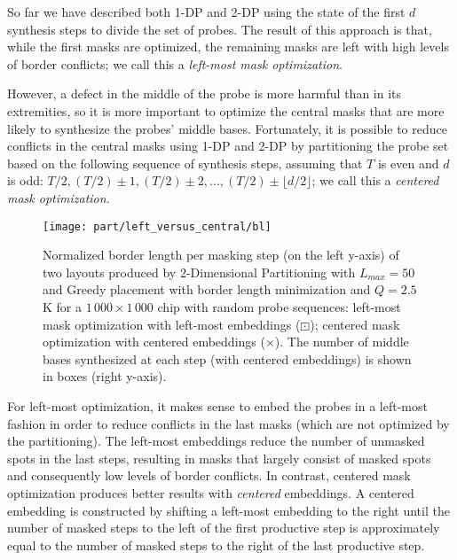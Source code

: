 So far we have described both 1-DP and 2-DP using the state of the first $d$
synthesis steps to divide the set of probes. The result of this approach is
that, while the first masks are optimized, the remaining masks are left with
high levels of border conflicts; we call this a \emph{left-most mask
optimization}.

However, a defect in the middle of the probe is more harmful than in its
extremities, so it is more important to optimize the central masks that are more
likely to synthesize the probes' middle bases. Fortunately, it is possible to
reduce conflicts in the central masks using 1-DP and 2-DP by partitioning the
probe set based on the following sequence of synthesis steps, assuming that $T$
is even and $d$ is odd:
$T/2, (T/2)\pm 1, (T/2)\pm 2, \dots, (T/2)\pm\lfloor d/2\rfloor$; we call this a
\emph{centered mask optimization}.

\begin{figure}[t]\centering
\texttt{[image: part/left\_versus\_central/bl]}
\caption{\label{fig:2d_left_center}
  Normalized border length per masking step (on the left y-axis) of two layouts
  produced by 2-Dimensional Partitioning with $L_{max}=50$ and Greedy placement
  with border length minimization and $Q=2.5$K for a $1\,000 \times 1\,000$ chip
  with random probe sequences: left-most mask optimization with left-most
  embeddings ({\tiny $\boxdot$}); centered mask optimization with centered
  embeddings ({\scriptsize $\times$}). The number of middle bases synthesized at
  each step (with centered embeddings) is shown in boxes (right y-axis).}
\end{figure}

For left-most optimization, it makes sense to embed the probes in a left-most
fashion in order to reduce conflicts in the last masks (which are not optimized
by the partitioning). The left-most embeddings reduce the number of unmasked
spots in the last steps, resulting in masks that largely consist of masked
spots and consequently low levels of border conflicts. In contrast, centered
mask optimization produces better results with \emph{centered} embeddings. A
centered embedding is constructed by shifting a left-most embedding to the right
until the number of masked steps to the left of the first productive step is
approximately equal to the number of masked steps to the right of the last
productive step.


